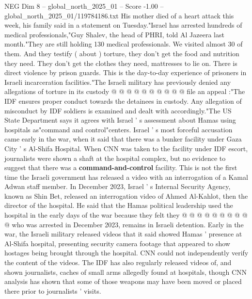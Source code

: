 \begin{textsample}{NEG Dim 8 – global\_north\_2025\_01 – Score -1.00 – global\_north\_2025\_01/119784186.txt}
His mother died of a heart attack this week, his family said in a statement on Tuesday."Israel has arrested hundreds of medical professionals,"Guy Shalev, the head of PHRI, told Al Jazeera last month."They are still holding 130 medical professionals.
We visited almost 30 of them.
And they testify ( about ) torture, they don't get the food and nutrition they need.
They don't get the clothes they need, mattresses to lie on.
There is direct violence by prison guards.
This is the day-to-day experience of prisoners in Israeli incarceration facilities."The Israeli military has previously denied any allegations of torture in its custody @ @ @ @ @ @ @ @ @ @ file an appeal :"The IDF ensures proper conduct towards the detainees in custody.
Any allegation of misconduct by IDF soldiers is examined and dealt with accordingly."The US State Department says it agrees with Israel ' s assessment about Hamas using hospitals as"command and control"centers.
Israel ' s most forceful accusation came early in the war, when it said that there was a bunker facility under Gaza City ' s Al-Shifa Hospital.
When CNN was taken to the facility under IDF escort, journalists were shown a shaft at the hospital complex, but no evidence to suggest that there was a \textbf{command-and-control} facility.
This is not the first time the Israeli government has released a video with an interrogation of a Kamal Adwan staff member.
In December 2023, Israel ' s Internal Security Agency, known as Shin Bet, released an interrogation video of Ahmed Al-Kahlot, then the director of the hospital.
He said that the Hamas political leadership used the hospital in the early days of the war because they felt they @ @ @ @ @ @ @ @ @ @ who was arrested in December 2023, remains in Israeli detention.
Early in the war, the Israeli military released videos that it said showed Hamas ' presence at Al-Shifa hospital, presenting security camera footage that appeared to show hostages being brought through the hospital.
CNN could not independently verify the content of the videos.
The IDF has also regularly released videos of, and shown journalists, caches of small arms allegedly found at hospitals, though CNN analysis has shown that some of those weapons may have been moved or placed there prior to journalists ' visits.

\end{textsample}
